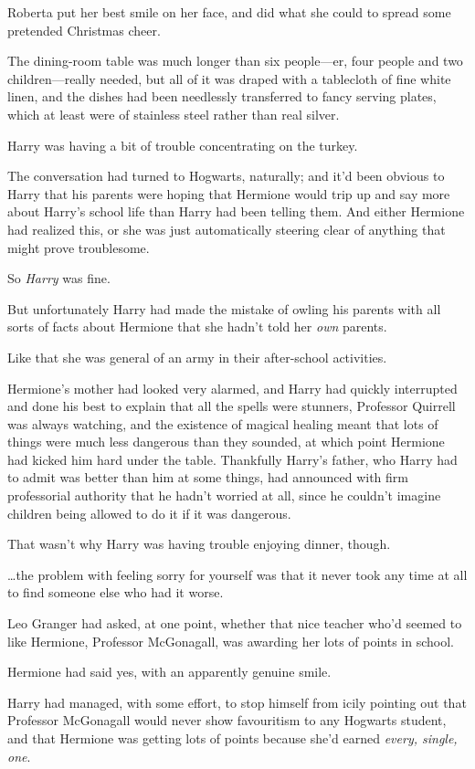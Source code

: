 Roberta put her best smile on her face, and did what she could to spread some pretended Christmas cheer.

\later

The dining-room table was much longer than six people—er, four people and two children—really needed, but all of it was draped with a tablecloth of fine white linen, and the dishes had been needlessly transferred to fancy serving plates, which at least were of stainless steel rather than real silver.

Harry was having a bit of trouble concentrating on the turkey.

The conversation had turned to Hogwarts, naturally; and it'd been obvious to Harry that his parents were hoping that Hermione would trip up and say more about Harry's school life than Harry had been telling them. And either Hermione had realized this, or she was just automatically steering clear of anything that might prove troublesome.

So \emph{Harry} was fine.

But unfortunately Harry had made the mistake of owling his parents with all sorts of facts about Hermione that she hadn't told her \emph{own} parents.

Like that she was general of an army in their after-school activities.

Hermione's mother had looked very alarmed, and Harry had quickly interrupted and done his best to explain that all the spells were stunners, Professor Quirrell was always watching, and the existence of magical healing meant that lots of things were much less dangerous than they sounded, at which point Hermione had kicked him hard under the table. Thankfully Harry's father, who Harry had to admit was better than him at some things, had announced with firm professorial authority that he hadn't worried at all, since he couldn't imagine children being allowed to do it if it was dangerous.

That wasn't why Harry was having trouble enjoying dinner, though.

…the problem with feeling sorry for yourself was that it never took any time at all to find someone else who had it worse.

Leo Granger had asked, at one point, whether that nice teacher who'd seemed to like Hermione, Professor McGonagall, was awarding her lots of points in school.

Hermione had said yes, with an apparently genuine smile.

Harry had managed, with some effort, to stop himself from icily pointing out that Professor McGonagall would never show favouritism to any Hogwarts student, and that Hermione was getting lots of points because she'd earned \emph{every, single, one}.

